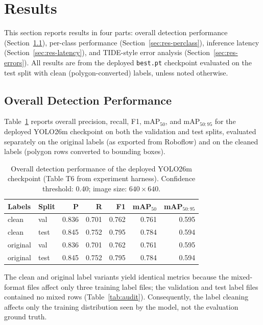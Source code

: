 \section{Results}
\label{sec:results}

This section reports results in four parts: overall detection performance
(Section~\ref{sec:res-overall}), per-class performance
(Section~\ref{sec:res-perclass}), inference latency
(Section~\ref{sec:res-latency}), and TIDE-style error analysis
(Section~\ref{sec:res-errors}).
All results are from the deployed \texttt{best.pt} checkpoint evaluated on
the test split with clean (polygon-converted) labels, unless noted otherwise.

\subsection{Overall Detection Performance}
\label{sec:res-overall}

Table~\ref{tab:overall} reports overall precision, recall, F1, mAP$_{50}$,
and mAP$_{50:95}$ for the deployed YOLO26m checkpoint on both the validation
and test splits, evaluated separately on the original labels (as exported
from Roboflow) and on the cleaned labels (polygon rows converted to bounding
boxes).

\begin{table}[htbp]
\centering
\caption{Overall detection performance of the deployed YOLO26m checkpoint
  (Table T6 from experiment harness). Confidence threshold: 0.40;
  image size: $640\times640$.}
\label{tab:overall}
\begin{tabular}{llrrrrr}
\toprule
Labels & Split & P & R & F1 & mAP$_{50}$ & mAP$_{50:95}$ \\
\midrule
clean    & val  & 0.836 & 0.701 & 0.762 & 0.761 & 0.595 \\
clean    & test & 0.845 & 0.752 & 0.795 & 0.784 & 0.594 \\
original & val  & 0.836 & 0.701 & 0.762 & 0.761 & 0.595 \\
original & test & 0.845 & 0.752 & 0.795 & 0.784 & 0.594 \\
\bottomrule
\end{tabular}
\end{table}

The clean and original label variants yield identical metrics because the
mixed-format files affect only three training label files; the validation
and test label files contained no mixed rows (Table~\ref{tab:audit}).
Consequently, the label cleaning affects only the training distribution
seen by the model, not the evaluation ground truth.

